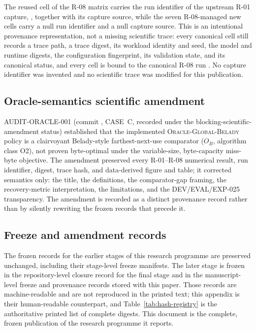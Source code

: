 The reused  cell of the R-08 matrix carries the run
identifier of the upstream R-01 capture,
\mbox{}, together with its capture source,
while the seven R-08-managed new cells carry a null run identifier and a
null capture source. This is an intentional provenance representation, not
a missing scientific trace: every canonical cell still records a trace
path, a trace digest, its workload identity and seed, the model and runtime
digests, the configuration fingerprint, its validation state, and its
canonical status, and every cell is bound to the canonical R-08 run
\mbox{}. No capture identifier was invented
and no scientific trace was modified for this publication.

\subsection{Oracle-semantics scientific amendment}

\textsc{AUDIT-ORACLE-001} (commit
, CASE~C, recorded under
the blocking-scientific-amendment status) established that the
implemented \textsc{Oracle-Global-Belady} policy is a clairvoyant
Belady-style farthest-next-use comparator ($O_B$, algorithm class O2), not
proven byte-optimal under the variable-size, byte-capacity miss-byte
objective. The amendment preserved every R-01--R-08 numerical result, run
identifier, digest, trace hash, and data-derived figure and table; it
corrected semantics only: the title, the definitions, the comparator-gap
framing, the recovery-metric interpretation, the limitations, and the
DEV/EVAL/EXP-025 transparency. The amendment is recorded as a distinct
provenance record rather than by silently rewriting the frozen records that
precede it.

\subsection{Freeze and amendment records}

The frozen records for the earlier stages of this research programme are
preserved unchanged, including their stage-level freeze manifests. The
later stage is frozen in the repository-level closure record for the final stage
and in the manuscript-level freeze and provenance records stored with this
paper. Those records are machine-readable and are not reproduced in the
printed text; this appendix is their human-readable counterpart, and
Table~\ref{tab:hash-registry} is the authoritative printed list of complete
digests. This document is the complete, frozen publication of the research
programme it reports.
